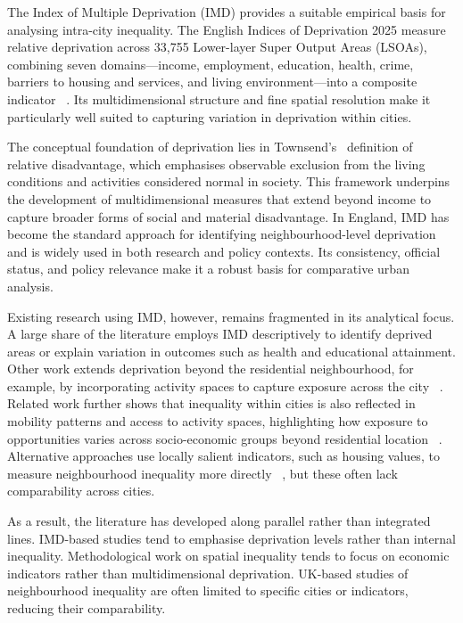 \documentclass[11pt,journal,compsoc]{IEEEtran}
\begin{document}
The Index of Multiple Deprivation (IMD) provides a suitable empirical basis for analysing intra-city inequality. The English Indices of Deprivation 2025 measure relative deprivation across 33,755 Lower-layer Super Output Areas (LSOAs), combining seven domains---income, employment, education, health, crime, barriers to housing and services, and living environment---into a composite indicator ~\cite{mcclennan2025english}. Its multidimensional structure and fine spatial resolution make it particularly well suited to capturing variation in deprivation within cities.

The conceptual foundation of deprivation lies in Townsend's~\cite{townsend1987deprivation} definition of relative disadvantage, which emphasises observable exclusion from the living conditions and activities considered normal in society. This framework underpins the development of multidimensional measures that extend beyond income to capture broader forms of social and material disadvantage. In England, IMD has become the standard approach for identifying neighbourhood-level deprivation ~\cite{mclennan2019english} and is widely used in both research and policy contexts. Its consistency, official status, and policy relevance make it a robust basis for comparative urban analysis.

Existing research using IMD, however, remains fragmented in its analytical focus. A large share of the literature employs IMD descriptively to identify deprived areas or explain variation in outcomes such as health and educational attainment. Other work extends deprivation beyond the residential neighbourhood, for example, by incorporating activity spaces to capture exposure across the city ~\cite{comber2022dynamic}. Related work further shows that inequality within cities is also reflected in mobility patterns and access to activity spaces, highlighting how exposure to opportunities varies across socio-economic groups beyond residential location ~\cite{gao2024unpacking}. Alternative approaches use locally salient indicators, such as housing values, to measure neighbourhood inequality more directly ~\cite{suss2023measuring}, but these often lack comparability across cities.

As a result, the literature has developed along parallel rather than integrated lines. IMD-based studies tend to emphasise deprivation levels rather than internal inequality. Methodological work on spatial inequality tends to focus on economic indicators rather than multidimensional deprivation. UK-based studies of neighbourhood inequality are often limited to specific cities or indicators, reducing their comparability.
\end{document}
